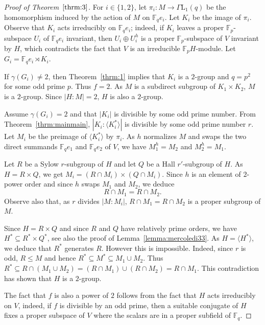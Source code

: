 \documentclass{amsart}
\begin{document}
\begin{proof}[Proof of Theorem~$\ref{thrm:3}$]

For $i\in \{1,2\}$, let $\pi_i:M\to\Gamma\mathrm{L}_1(q)$ be the homomorphism induced by the action of $M$ on $\mathbb{F}_qe_i$. Let $K_i$ be the image of $\pi_i$. Observe that $K_i$ acts irreducibly on $\mathbb{F}_qe_i$; indeed, if $K_i$ leaves a proper $\mathbb{F}_p$-subspace $U_i$ of $\mathbb{F}_qe_i$ invariant, then $U_i\oplus U_i^h$ is a proper $\mathbb{F}_p$-subspace of $V$ invariant by $H$, which contradicts the fact that $V$ is an irreducible $\mathbb{F}_pH$-module. Let $G_i=\mathbb{F}_qe_i\rtimes K_i$.

If $\gamma(G_i)\ne 2$, then Theorem~\ref{thrm:1} implies that $K_i$ is a $2$-group and $q=p^2$ for some odd prime $p$. Thus $f=2$. As $M$ is a subdirect subgroup of $K_1\times K_2$, $M$ is a $2$-group. Since $|H:M|=2$, $H$ is also a $2$-group.

Assume $\gamma(G_i)= 2$ and that $|K_i|$ is divisible by some odd prime number. From Theorem~\ref{thrm:mainmain}, $|K_i:\langle K_i^\ast\rangle|$ is divisible by some odd prime number $r$. 
 Let $M_i$ be the preimage of $\langle K_i^\ast\rangle$ by $\pi_i$. As $h$ normalizes $M$ and swaps the two direct summands $\mathbb{F}_qe_1$ and $\mathbb{F}_qe_2$ of $V$, we have $M_1^h=M_2$ and $M_2^h=M_1$.
 
Let $R$ be a Sylow $r$-subgroup of $H$ and let $Q$ be a Hall $r'$-subgroup of $H$. As $H=R\times Q$, we get $M_i=(R\cap M_i)\times (Q\cap M_i)$. Since $h$ is an element of $2$-power order and since $h$ swaps $M_1$ and $M_2$, we deduce
$$R\cap M_1=R\cap M_2.$$ 
Observe also that, as $r$ divides $|M:M_i|$, $R\cap M_1=R\cap M_2$ is a proper subgroup of $M$.

Since $H=R\times Q$ and since $R$ and $Q$ have relatively prime orders, we have $H^\ast\subseteq R^\ast\times Q^\ast$, see also the proof of Lemma~\ref{lemma:mercoledi33}. As $H=\langle H^\ast\rangle$, we deduce that $R^\ast$ generates $R$. However this is impossible. Indeed, since $r$ is odd, $R\le M$ and hence $R^\ast\subseteq M^\ast\subseteq M_1\cup M_2$. Thus $R^\ast\subseteq R\cap (M_1\cup M_2)=(R\cap M_1)\cup (R\cap M_2)=R\cap M_1$. This contradiction has shown that $H$ is a $2$-group.

The fact that $f$ is also a power of $2$ follows from the fact that $H$ acts irreducibly on $V$, indeed, if $f$ is divisible by an odd prime, then a suitable conjugate of $H$ fixes a proper subspace of $V$ where the scalars are in a proper subfield of $\mathbb{F}_q$.






\end{proof}
\end{document}
